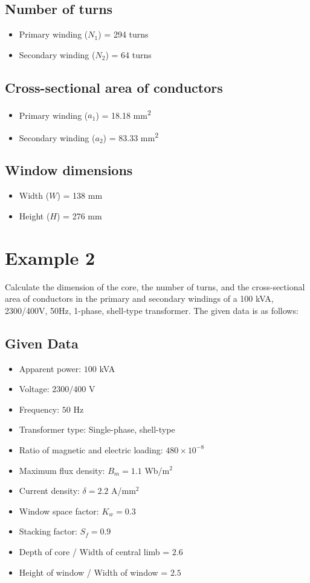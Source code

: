 \documentclass[12pt]{article}
\begin{document}
\subsection*{Number of turns}
\begin{itemize}
	\item Primary winding ($N_1$) = 294 turns
	\item Secondary winding ($N_2$) = 64 turns
\end{itemize}

\subsection*{Cross-sectional area of conductors}
\begin{itemize}
	\item Primary winding ($a_1$) = 18.18 mm\textsuperscript{2}
	\item Secondary winding ($a_2$) = 83.33 mm\textsuperscript{2}
\end{itemize}

\subsection*{Window dimensions}
\begin{itemize}
	\item Width ($W$) = 138 mm
	\item Height ($H$) = 276 mm
\end{itemize}



\section*{Example 2} 
Calculate the dimension of the core, the number of turns, and the cross-sectional area of conductors in the primary and secondary windings of a 100 kVA, 2300/400V, 50Hz, 1-phase, shell-type transformer. The given data is as follows:

\subsection*{Given Data}
\begin{itemize}
	\item Apparent power: $100$ kVA
	\item Voltage: $2300/400$ V
	\item Frequency: $50$ Hz
	\item Transformer type: Single-phase, shell-type
	\item Ratio of magnetic and electric loading: $480 \times 10^{-8}$
	\item Maximum flux density: $B_m = 1.1$ Wb/m$^2$
	\item Current density: $\delta = 2.2$ A/mm$^2$
	\item Window space factor: $K_w = 0.3$
	\item Stacking factor: $S_f = 0.9$
	\item Depth of core / Width of central limb = $2.6$
	\item Height of window / Width of window = $2.5$
\end{itemize}
\end{document}
